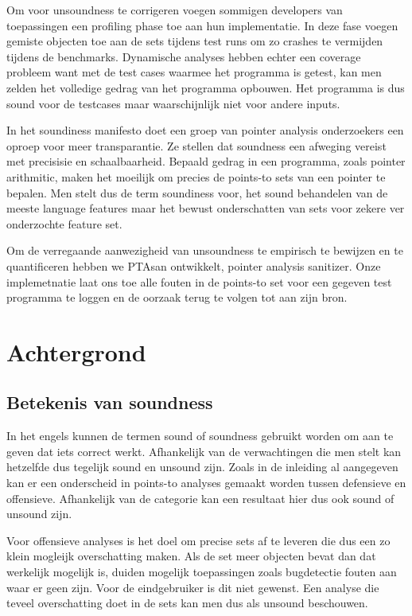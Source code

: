 \documentclass[conference]{IEEEtran}
\begin{document}
Om voor unsoundness te corrigeren voegen sommigen developers van toepassingen een profiling phase toe aan hun implementatie\cite{jin_annotating_2022}\cite{kirth_pkru-safe_2022}.
In deze fase voegen gemiste objecten toe aan de sets tijdens test runs om zo crashes te vermijden tijdens de benchmarks. Dynamische analyses hebben echter een coverage probleem 
want met de test cases waarmee het programma is getest, kan men zelden het volledige gedrag van het programma opbouwen. Het programma is dus sound voor de testcases maar 
waarschijnlijk niet voor andere inputs.

In het soundiness manifesto\cite{livshits_defense_2015} doet een groep van pointer analysis onderzoekers een oproep voor meer 
transparantie. Ze stellen dat soundness een afweging vereist met precisisie en schaalbaarheid. Bepaald gedrag in een programma, 
zoals pointer arithmitic, maken het moeilijk om precies de points-to sets van een pointer te bepalen. Men stelt dus de term 
soundiness voor, het sound behandelen van de meeste language features maar het bewust onderschatten van sets voor zekere 
ver onderzochte feature set. 

Om de verregaande aanwezigheid van unsoundness te empirisch te bewijzen en te quantificeren hebben we PTAsan ontwikkelt, pointer analysis 
sanitizer. Onze implemetnatie laat ons toe alle fouten in de points-to set voor een gegeven test programma te loggen en de oorzaak terug 
te volgen tot aan zijn bron. 

\section{Achtergrond}

\subsection{Betekenis van soundness}
In het engels kunnen de termen sound of soundness gebruikt worden om aan te geven dat iets correct werkt. Afhankelijk van de verwachtingen die men stelt kan hetzelfde dus tegelijk sound en unsound zijn. Zoals in de inleiding al aangegeven kan er een onderscheid in points-to analyses gemaakt worden tussen defensieve en offensieve. Afhankelijk van de categorie kan een resultaat hier dus ook sound of unsound zijn.

Voor offensieve analyses is het doel om precise sets af te leveren die dus een zo klein mogleijk overschatting maken. Als de set meer objecten bevat dan dat werkelijk mogelijk is, duiden mogelijk toepassingen zoals bugdetectie fouten aan waar er geen zijn. Voor de eindgebruiker is dit niet gewenst. Een analyse die teveel overschatting doet in de sets kan men dus als unsound beschouwen.
\end{document}
